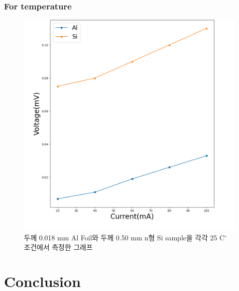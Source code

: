 \documentclass[aps,reprint,superscriptaddress,10pt]{revtex4-2}
\begin{document}
\subsubsection{For temperature}
\begin{figure}[htbp]
    \centering
    \includegraphics[scale = 0.25]{AlSi.png}
    \caption{두께 0.018 mm Al Foil와 두께 0.50 mm
    n형 Si sample을 각각 25 C$^\circ$ 조건에서
    측정한 그래프}
    \label{AlSi}
  \end{figure}

\section{Conclusion}



% 




\vfill
\end{document}
